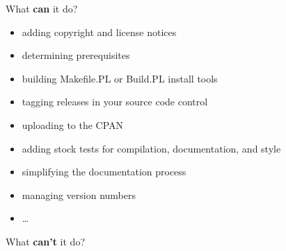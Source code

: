 \documentclass[serif,14pt,color=usenames,dvipsnames]{beamer}
\begin{document}
\begin{frame}{What \textbf{can} it do?}
\begin{itemize}
	\item adding copyright and license notices
	\item determining prerequisites
	\item building Makefile.PL or Build.PL install tools
	\item tagging releases in your source code control
	\item uploading to the CPAN
	\item adding stock tests for compilation, documentation, and style
	\item simplifying the documentation process
	\item managing version numbers
	\item \dots
\end{itemize}
\end{frame}


\begin{frame}[fragile]{What \textbf{can't} it do?}
\end{frame}
\end{document}
